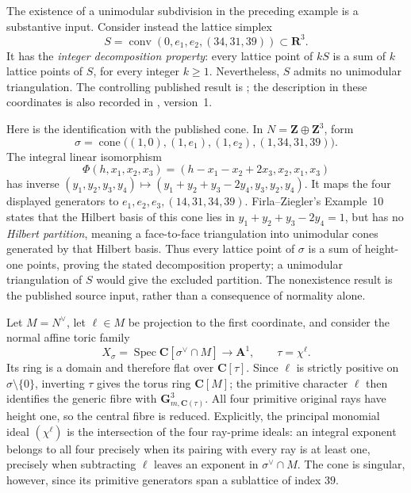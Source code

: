 \begin{example}
\label{ex:height-one-idp-obstruction}
The existence of a unimodular subdivision in the preceding example is
a substantive input. Consider instead the lattice simplex
\[
                  S=\operatorname{conv}(0,e_1,e_2,(34,31,39))
                      \subset\mathbf R^3.
\]
It has the \emph{integer decomposition property}: every lattice point
of $kS$ is a sum of $k$ lattice points of $S$, for every integer
$k\ge1$. Nevertheless, $S$ admits no unimodular triangulation. The
controlling published result is \cite[Example~10]{FZ99Hilbert}; the
description in these coordinates is also recorded in
\cite[Examples~6.4--6.5]{LTTZ26HNF}, version~1.

Here is the identification with the published cone. In
$N=\mathbf Z\oplus\mathbf Z^3$, form
\[
 \sigma=\operatorname{cone}
   \bigl((1,0),(1,e_1),(1,e_2),(1,34,31,39)\bigr).
\]
The integral linear isomorphism
\[
 \Phi(h,x_1,x_2,x_3)
       =(h-x_1-x_2+2x_3,x_2,x_1,x_3)
\]
has inverse
$(y_1,y_2,y_3,y_4)\mapsto
(y_1+y_2+y_3-2y_4,y_3,y_2,y_4)$. It maps the four displayed
generators to $e_1,e_2,e_3,(14,31,34,39)$. Firla--Ziegler's
Example~10 states that the Hilbert basis of this cone lies in
$y_1+y_2+y_3-2y_4=1$, but has no \emph{Hilbert partition}, meaning
a face-to-face triangulation into unimodular cones generated by
that Hilbert basis. Thus every lattice point of $\sigma$ is a sum
of height-one points, proving the stated decomposition property;
a unimodular triangulation of $S$ would give the excluded partition.
The nonexistence result is the published source input, rather than
a consequence of normality alone.

Let $M=N^\vee$, let $\ell\in M$ be projection to the first
coordinate, and consider the normal affine toric family
\[
 X_\sigma=\operatorname{Spec}\mathbf C[\sigma^\vee\cap M]
       \longrightarrow\mathbf A^1,\qquad \tau=\chi^\ell.
\]
Its ring is a domain and therefore flat over $\mathbf C[\tau]$.
Since $\ell$ is strictly positive on $\sigma\setminus\{0\}$,
inverting $\tau$ gives the torus ring $\mathbf C[M]$; the
primitive character $\ell$ then identifies the generic fibre with
$\mathbf G_{m,\mathbf C(\tau)}^3$. All four primitive original
rays have height one, so the central fibre is reduced. Explicitly,
the principal monomial ideal $(\chi^\ell)$ is the intersection of
the four ray-prime ideals: an integral exponent belongs to all four
precisely when its pairing with every ray is at least one, precisely
when subtracting $\ell$ leaves an exponent in $\sigma^\vee\cap M$.
The cone is singular, however, since its primitive generators span
a sublattice of index $39$.


\end{example}
